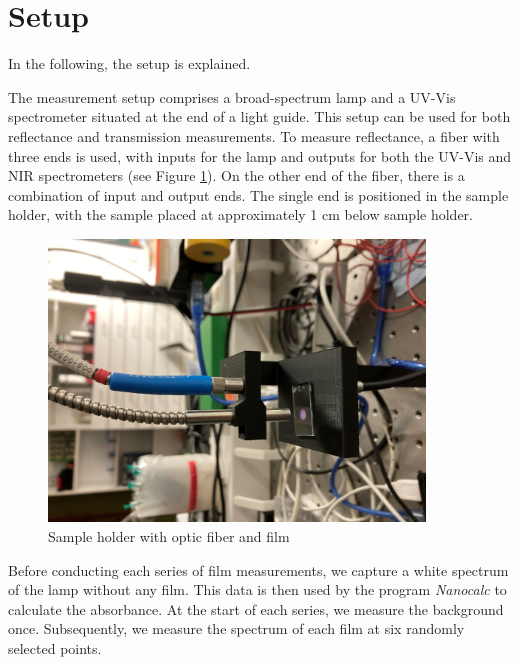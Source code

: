 \section{Setup}
\label{sec:setup}

In the following, the setup is explained. 

The measurement setup comprises a broad-spectrum lamp and a UV-Vis spectrometer situated at the end of a light guide. This setup can be used for both reflectance and transmission measurements. To measure reflectance, a fiber with three ends is used, with inputs for the lamp and outputs for both the UV-Vis and NIR spectrometers (see Figure \ref{fig:setup}). On the other end of the fiber, there is a combination of input and output ends. The single end is positioned in the sample holder, with the sample placed at approximately 1 cm below sample holder.

\begin{figure}[ht]
    \centering
    \includegraphics[width = 10cm]{Bilder/Auswertung/Setup/Setup.jpg}
    \caption{Sample holder with optic fiber and film}
    \label{fig:setup}
\end{figure}

Before conducting each series of film measurements, we capture a white spectrum of the lamp without any film. This data is then used by the program \textit{Nanocalc} to calculate the absorbance. At the start of each series, we measure the background once. Subsequently, we measure the spectrum of each film at six randomly selected points.